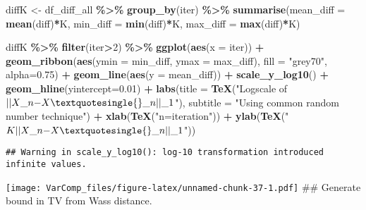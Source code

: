 \documentclass[
]{article}
\newenvironment{Shaded}{\begin{snugshade}}{\end{snugshade}}
\newcommand{\AttributeTok}[1]{\textcolor[rgb]{0.13,0.29,0.53}{#1}}
\newcommand{\DecValTok}[1]{\textcolor[rgb]{0.00,0.00,0.81}{#1}}
\newcommand{\FloatTok}[1]{\textcolor[rgb]{0.00,0.00,0.81}{#1}}
\newcommand{\FunctionTok}[1]{\textcolor[rgb]{0.13,0.29,0.53}{\textbf{#1}}}
\newcommand{\NormalTok}[1]{#1}
\newcommand{\OtherTok}[1]{\textcolor[rgb]{0.56,0.35,0.01}{#1}}
\newcommand{\SpecialCharTok}[1]{\textcolor[rgb]{0.81,0.36,0.00}{\textbf{#1}}}
\newcommand{\StringTok}[1]{\textcolor[rgb]{0.31,0.60,0.02}{#1}}
\begin{document}
\begin{Shaded}
\begin{Highlighting}[]
\NormalTok{diffK }\OtherTok{\textless{}{-}}\NormalTok{ df\_diff\_all }\SpecialCharTok{\%\textgreater{}\%}
  \FunctionTok{group\_by}\NormalTok{(iter) }\SpecialCharTok{\%\textgreater{}\%}
  \FunctionTok{summarise}\NormalTok{(}\AttributeTok{mean\_diff =} \FunctionTok{mean}\NormalTok{(diff)}\SpecialCharTok{*}\NormalTok{K, }\AttributeTok{min\_diff =}  \FunctionTok{min}\NormalTok{(diff)}\SpecialCharTok{*}\NormalTok{K, }\AttributeTok{max\_diff =} \FunctionTok{max}\NormalTok{(diff)}\SpecialCharTok{*}\NormalTok{K) }

\NormalTok{diffK }\SpecialCharTok{\%\textgreater{}\%} 
  \FunctionTok{filter}\NormalTok{(iter}\SpecialCharTok{\textgreater{}}\DecValTok{2}\NormalTok{) }\SpecialCharTok{\%\textgreater{}\%}  
  \FunctionTok{ggplot}\NormalTok{(}\FunctionTok{aes}\NormalTok{(}\AttributeTok{x =}\NormalTok{ iter)) }\SpecialCharTok{+}
  \FunctionTok{geom\_ribbon}\NormalTok{(}\FunctionTok{aes}\NormalTok{(}\AttributeTok{ymin =}\NormalTok{ min\_diff, }\AttributeTok{ymax =}\NormalTok{ max\_diff), }\AttributeTok{fill =} \StringTok{"grey70"}\NormalTok{, }\AttributeTok{alpha=}\FloatTok{0.75}\NormalTok{) }\SpecialCharTok{+}
  \FunctionTok{geom\_line}\NormalTok{(}\FunctionTok{aes}\NormalTok{(}\AttributeTok{y =}\NormalTok{ mean\_diff)) }\SpecialCharTok{+} \FunctionTok{scale\_y\_log10}\NormalTok{() }\SpecialCharTok{+} \FunctionTok{geom\_hline}\NormalTok{(}\AttributeTok{yintercept=}\FloatTok{0.01}\NormalTok{) }\SpecialCharTok{+}
  \FunctionTok{labs}\NormalTok{(}\AttributeTok{title =} \FunctionTok{TeX}\NormalTok{(}\StringTok{"Logscale of $||X\_n{-}X\textquotesingle{}\_n||\_1$"}\NormalTok{), }\AttributeTok{subtitle =} \StringTok{"Using common random number technique"}\NormalTok{) }\SpecialCharTok{+}
  \FunctionTok{xlab}\NormalTok{(}\FunctionTok{TeX}\NormalTok{(}\StringTok{"n=iteration"}\NormalTok{)) }\SpecialCharTok{+} \FunctionTok{ylab}\NormalTok{(}\FunctionTok{TeX}\NormalTok{(}\StringTok{"$K||X\_n{-}X\textquotesingle{}\_n||\_1$"}\NormalTok{))}
\end{Highlighting}
\end{Shaded}

\begin{verbatim}
## Warning in scale_y_log10(): log-10 transformation introduced infinite values.
\end{verbatim}

\texttt{[image: VarComp\_files/figure-latex/unnamed-chunk-37-1.pdf]} \#\#
Generate bound in TV from Wass distance.
\end{document}

